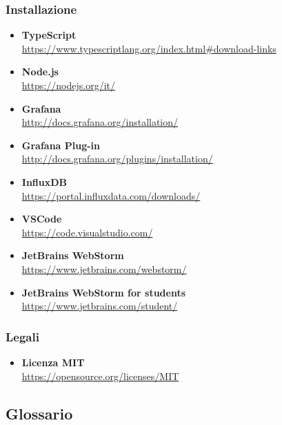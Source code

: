 \subsubsection{Installazione}
\begin{itemize}
	\item{\textbf{TypeScript}\\
		\url{https://www.typescriptlang.org/index.html#download-links}}
	\item{\textbf{Node.js}\\
		\url{https://nodejs.org/it/}}
	\item{\textbf{Grafana}\\
		\url{http://docs.grafana.org/installation/}}
	\item{\textbf{Grafana Plug-in}\\
		\url{http://docs.grafana.org/plugins/installation/}}
	\item{\textbf{InfluxDB}\\
		\url{https://portal.influxdata.com/downloads/}}
	\item{\textbf{VSCode}\\
		\url{https://code.visualstudio.com/}}
	\item{\textbf{JetBrains WebStorm}\\
		\url{https://www.jetbrains.com/webstorm/}}
	\item{\textbf{JetBrains WebStorm for students}\\
		\url{https://www.jetbrains.com/student/}}
\end{itemize}	
\subsubsection{Legali}
\begin{itemize}
	\item{\textbf{Licenza MIT}\\
		\url{https://opensource.org/licenses/MIT}}
\end{itemize}
\subsection{Glossario}